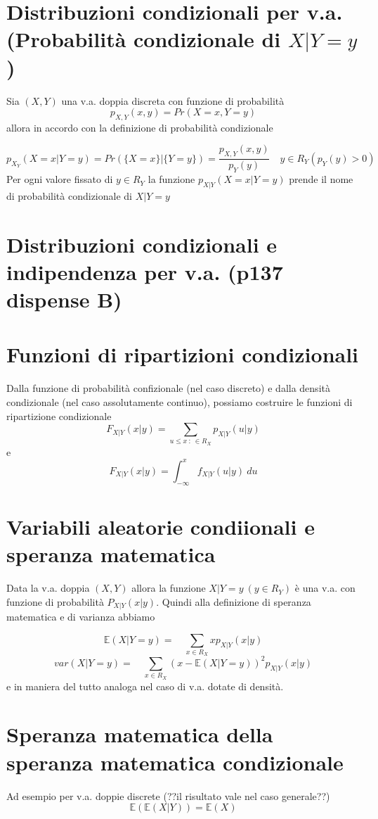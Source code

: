 \documentclass[a4paper]{report}
\begin{document}
  \section{Distribuzioni condizionali per v.a. (Probabilità condizionale di $X|Y = y$)}
  Sia $(X,Y)$ una v.a. doppia discreta con funzione di probabilità
  \[ p_{X,Y}(x,y) = Pr(X = x, Y = y) \]
    allora in accordo con la definizione di probabilità condizionale

  \[ p_{X_Y}(X=x|Y=y) = Pr(\{ X=x \}|\{ Y=y \}) = \frac{p_{X,Y}(x,y)}{p_Y(y)} \quad y \in R_Y(p_Y(y)>0) \]
  Per ogni valore fissato di $y \in R_Y$ la funzione $p_{X|Y}(X=x|Y=y)$ prende il nome di probabilità condizionale di $X|Y = y$

  \section{Distribuzioni condizionali e indipendenza per v.a. (p137 dispense B)}

  \section{Funzioni di ripartizioni condizionali}
  Dalla funzione di probabilità confizionale (nel caso discreto) e dalla densità condizionale (nel caso assolutamente continuo), possiamo costruire le funzioni di ripartizione condizionale
  \[ F_{X|Y}(x|y) = \sum_{u \leqslant x \: : \: \in R_X} p_{X|Y}(u|y) \]
  e
  \[ F_{X|Y}(x|y) = \int_{-\infty}^{x} f_{X|Y}(u|y) \: du \]

  \section{Variabili aleatorie condiionali e speranza matematica}
  Data la v.a. doppia $(X,Y)$ allora la funzione $X|Y = y \: (y \in R_Y)$ è una v.a. con funzione di probabilità $P_{X|Y}(x|y)$.
    Quindi alla definizione di speranza matematica e di varianza abbiamo

  \[\mathbb{E}(X|Y=y)= \quad \sum_{x \in R_X} x p_{X|Y}(x|y) \]
  \[ var(X|Y=y)= \quad \sum_{x\in R_X}(x - \mathbb{E}(X|Y=y))^2 p_{X|Y}(x|y) \]
  e in maniera del tutto analoga nel caso di v.a. dotate di densità.

  \section{Speranza matematica della speranza matematica condizionale}
  Ad esempio per v.a. doppie discrete (??il risultato vale nel caso generale??)
  \[ \mathbb{E}(\mathbb{E}(X|Y)) = \mathbb{E}(X) \]
\end{document}
